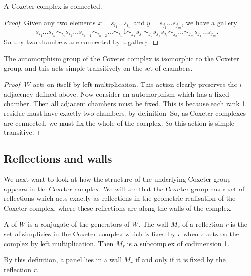 \documentclass[11pt]{article}
\begin{document}
\begin{lemma}
    A Coxeter complex is connected.
\end{lemma}

\begin{proof}
    Given any two elements $x=s_{i_1}\hdots s_{i_n}$ and $y=s_{j_1}\hdots s_{j_m}$, we have a gallery
    \[s_{i_1}\hdots s_{i_n}\sim_{i_n}s_{i_1}\hdots s_{i_{n-1}}\sim_{i_{n-2}}\hdots \sim_{i_n} 1 \sim_{j_1}s_{j_1}\sim_{j_2}s_{j_1}s_{j_2}\sim_{j_3}\hdots\sim_{j_m}s_{j_1}\hdots s_{j_m}.\]
    So any two chambers are connected by a gallery.
\end{proof}


\begin{lemma}
    The automorphism group of the Coxeter complex is isomorphic to the Coxeter group, and this acts simple-transitively on the set of chambers.
\end{lemma}

\begin{proof}
    $W$ acts on itself by left multiplication. This action clearly preserves the $i$-adjacency defined above. Now consider an automorphism which has a fixed chamber. Then all adjacent chambers must be fixed. This is because each rank 1 residue must have exactly two chambers, by definition. So, as Coxeter complexes are connected, we must fix the whole of the complex. So this action is simple-transitive. 
\end{proof}

\subsection{Reflections and walls}
We next want to look at how the structure of the underlying Coxeter group appears in the Coxeter complex. We will see that the Coxeter group has a set of reflections which acts exactly as reflections in the geometric realisation of the Coxeter complex, where these reflections are along the walls of the complex. 

\begin{definition}
    A  of $W$ is a conjugate of the generators of $W$. The wall $M_r$ of a reflection $r$ is the set of simplicies in the Coxeter complex which is fixed by $r$ when $r$ acts on the complex by left multiplication. Then $M_r$ is a subcomplex of codimension 1.
\end{definition}

By this definition, a panel lies in a wall $M_r$ if and only if it is fixed by the reflection $r$. 
\end{document}
